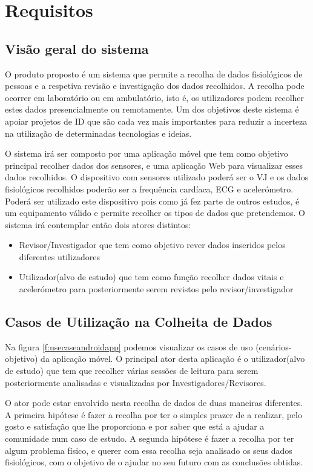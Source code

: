 \chapter{Requisitos}

\section{Visão geral do sistema}
O produto proposto é um sistema que permite a recolha de dados fisiológicos de pessoas e a respetiva revisão e investigação dos dados recolhidos. A recolha pode ocorrer em laboratório ou em ambulatório, isto é, os utilizadores podem recolher estes dados presencialmente ou remotamente. Um dos objetivos deste sistema é apoiar projetos de \gls{ID} que são cada vez mais importantes para reduzir a incerteza na utilização de determinadas tecnologias e ideias.
\par 
O sistema irá ser composto por uma aplicação móvel que tem como objetivo principal recolher dados dos sensores, e uma aplicação Web para visualizar esses dados recolhidos. O dispositivo com sensores utilizado poderá ser o \gls{VJ} e os dados fisiológicos recolhidos poderão ser a frequência cardíaca, \gls{ECG} e acelerómetro. Poderá ser utilizado este dispositivo pois como já fez parte de outros estudos, é um equipamento válido e permite recolher os tipos de dados que pretendemos. O sistema irá contemplar então dois atores distintos:
\begin{itemize}
  \item Revisor/Investigador que tem como objetivo rever dados inseridos pelos diferentes utilizadores
  \item Utilizador(alvo de estudo) que tem como função recolher dados vitais e acelerómetro para posteriormente serem revistos pelo revisor/investigador
\end{itemize}

\section{Casos de Utilização na Colheita de Dados}

Na figura \ref{f:usecaseandroidapp} podemos visualizar os casos de uso (cenários-objetivo) da aplicação móvel. O principal ator desta aplicação é o utilizador(alvo de estudo) que tem que recolher várias sessões de leitura para serem posteriormente analisadas e visualizadas por Investigadores/Revisores. 
\par
O ator pode estar envolvido nesta recolha de dados de duas maneiras diferentes. A primeira hipótese é fazer a recolha por ter o simples prazer de a realizar, pelo gosto e satisfação que lhe proporciona e por saber que está a ajudar a comunidade num caso de estudo. A segunda hipótese é fazer a recolha por ter algum problema físico, e querer com essa recolha seja analisado os seus dados fisiológicos, com o objetivo de o ajudar no seu futuro com as conclusões obtidas.

